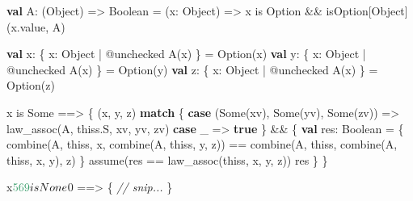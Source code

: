 \documentclass[
  ignorenonframetext,
]{beamer}
\newenvironment{Shaded}{}{}
\newcommand{\CommentTok}[1]{\textcolor[rgb]{0.38,0.63,0.69}{\textit{#1}}}
\newcommand{\DecValTok}[1]{\textcolor[rgb]{0.25,0.63,0.44}{#1}}
\newcommand{\FunctionTok}[1]{\textcolor[rgb]{0.02,0.16,0.49}{#1}}
\newcommand{\KeywordTok}[1]{\textcolor[rgb]{0.00,0.44,0.13}{\textbf{#1}}}
\newcommand{\NormalTok}[1]{#1}
\begin{document}
\begin{frame}[fragile]

\begin{Shaded}
\begin{Highlighting}[]
\KeywordTok{val}\NormalTok{ A: (Object) => Boolean = (x: Object) =>}
\NormalTok{  x is Option && isOption[Object](x.}\FunctionTok{value}\NormalTok{, A)}

\KeywordTok{val}\NormalTok{ x: \{ x: Object | @unchecked }\FunctionTok{A}\NormalTok{(x) \} = Option(x)}
\KeywordTok{val}\NormalTok{ y: \{ x: Object | @unchecked }\FunctionTok{A}\NormalTok{(x) \} = Option(y)}
\KeywordTok{val}\NormalTok{ z: \{ x: Object | @unchecked }\FunctionTok{A}\NormalTok{(x) \} = Option(z)}

\NormalTok{x is Some ==> \{}
\NormalTok{  (x, y, z) }\KeywordTok{match}\NormalTok{ \{}
    \KeywordTok{case}\NormalTok{ (Some(xv), Some(yv), Some(zv)) =>}
      \FunctionTok{law_assoc}\NormalTok{(A, thiss.}\FunctionTok{S}\NormalTok{, xv, yv, zv)}
    \KeywordTok{case}\NormalTok{ _ =>}
      \KeywordTok{true}
\NormalTok{  \} && \{}
    \KeywordTok{val}\NormalTok{ res: Boolean = \{}
      \FunctionTok{combine}\NormalTok{(A, thiss, x, }\FunctionTok{combine}\NormalTok{(A, thiss, y, z)) ==}
      \FunctionTok{combine}\NormalTok{(A, thiss, }\FunctionTok{combine}\NormalTok{(A, thiss, x, y), z)}
\NormalTok{    \}}
    \FunctionTok{assume}\NormalTok{(res == }\FunctionTok{law_assoc}\NormalTok{(thiss, x, y, z))}
\NormalTok{    res}
\NormalTok{  \}}
\NormalTok{\}}
\end{Highlighting}
\end{Shaded}

\end{frame}

\begin{frame}[fragile]

\begin{Shaded}
\begin{Highlighting}[]
\NormalTok{x$}\DecValTok{569}\NormalTok{ is None$}\DecValTok{0}\NormalTok{ ==> \{}
  \CommentTok{// snip...}
\NormalTok{\}}
\end{Highlighting}
\end{Shaded}

\end{frame}
\end{document}
